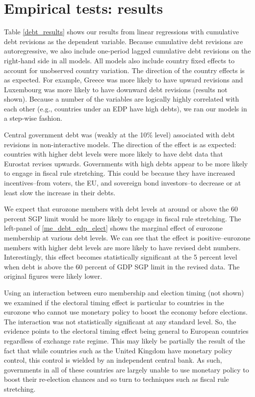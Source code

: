 \documentclass[]{article}
\begin{document}
\section{Empirical tests: results}

Table \ref{debt_results} shows our results from linear regressions with cumulative debt revisions as the dependent variable. Because cumulative debt revisions are autoregressive, we also include one-period lagged cumulative debt revisions on the right-hand side in all models. All models also include country fixed effects to account for unobserved country variation. The direction of the country effects is as expected. For example, Greece was more likely to have upward revisions and Luxembourg was more likely to have downward debt revisions (results not shown). Because a number of the variables are logically highly correlated with each other (e.g., countries under an EDP have high debts), we ran our models in a step-wise fashion.

Central government debt was (weakly at the 10\% level) associated with debt revisions in non-interactive models. The direction of the effect is as expected: countries with higher debt levels were more likely to have debt data that Eurostat revises upwards. Governments with high debts appear to be more likely to engage in fiscal rule stretching. This could be because they have increased incentives--from voters, the EU, and sovereign bond investors--to decrease or at least slow the increase in their debts.

We expect that eurozone members with debt levels at around or above the 60 percent SGP limit would be more likely to engage in fiscal rule stretching. The left-panel of \ref{me_debt_edp_elect} shows the marginal effect of eurozone membership at various debt levels. We can see that the effect is positive--eurozone members with higher debt levels are more likely to have revised debt numbers. Interestingly, this effect becomes statistically significant at the 5 percent level when debt is above the 60 percent of GDP SGP limit in the revised data. The original figures were likely lower.

Using an interaction between euro membership and election timing (not shown) we examined if the electoral timing effect is particular to countries in the eurozone who cannot use monetary policy to boost the economy before elections. The interaction was not statistically significant at any standard level. So, the evidence points to the electoral timing effect being general to European countries regardless of exchange rate regime. This may likely be partially the result of the fact that while countries such as the United Kingdom have monetary policy control, this control is wielded by an independent central bank. As such, governments in all of these countries are largely unable to use monetary policy to boost their re-election chances and so turn to techniques such as fiscal rule stretching.
\end{document}
